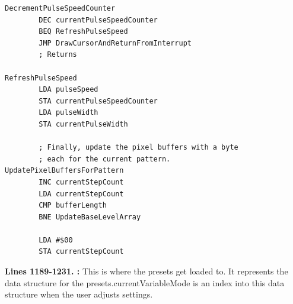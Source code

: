 \clearpage
\begin{lstlisting}[caption=From \icode{MainInterruptHandler}.]
DecrementPulseSpeedCounter   
        DEC currentPulseSpeedCounter
        BEQ RefreshPulseSpeed
        JMP DrawCursorAndReturnFromInterrupt
        ; Returns

RefreshPulseSpeed   
        LDA pulseSpeed
        STA currentPulseSpeedCounter
        LDA pulseWidth
        STA currentPulseWidth

        ; Finally, update the pixel buffers with a byte
        ; each for the current pattern.        
UpdatePixelBuffersForPattern    
        INC currentStepCount
        LDA currentStepCount
        CMP bufferLength
        BNE UpdateBaseLevelArray

        LDA #$00
        STA currentStepCount
\end{lstlisting}
\clearpage

\textbf{Lines 1189-1231. :} 
 This is where the presets get loaded to. It represents the data structure
 for the presets.currentVariableMode is an index into this data structure
 when the user adjusts settings.
\clearpage

